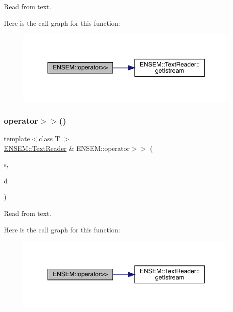 Read from text. 

Here is the call graph for this function\+:\nopagebreak
\begin{figure}[H]
\begin{center}
\leavevmode
\includegraphics[width=336pt]{d2/d94/namespaceENSEM_a5d4f982512e5f2e704e9f359ce2bf383_cgraph}
\end{center}
\end{figure}
\mbox{\label{namespaceENSEM_a0c98998b29525fa9334da078ac37fe70}} 
\subsubsection{\texorpdfstring{operator$>$$>$()}{operator>>()}\hspace{0.1cm}{\footnotesize\ttfamily [6/7]}}
{\footnotesize\ttfamily template$<$class T $>$ \\
\mbox{\hyperlink{classENSEM_1_1TextReader}{E\+N\+S\+E\+M\+::\+Text\+Reader}} \& E\+N\+S\+E\+M\+::operator$>$$>$ (\begin{DoxyParamCaption}\item[{\mbox{\hyperlink{classENSEM_1_1TextReader}{E\+N\+S\+E\+M\+::\+Text\+Reader}} \&}]{s,  }\item[{\mbox{\hyperlink{classENSEM_1_1Ensem}{Ensem}}$<$ \mbox{\hyperlink{classENSEM_1_1OVector}{O\+Vector}}$<$ T $>$ $>$ \&}]{d }\end{DoxyParamCaption})\hspace{0.3cm}{\ttfamily [inline]}}



Read from text. 

Here is the call graph for this function\+:\nopagebreak
\begin{figure}[H]
\begin{center}
\leavevmode
\includegraphics[width=336pt]{d2/d94/namespaceENSEM_a0c98998b29525fa9334da078ac37fe70_cgraph}
\end{center}
\end{figure}
\mbox{\label{namespaceENSEM_a0fb9e35cf8c1d41d42dd10cefcf7cbe5}} 
